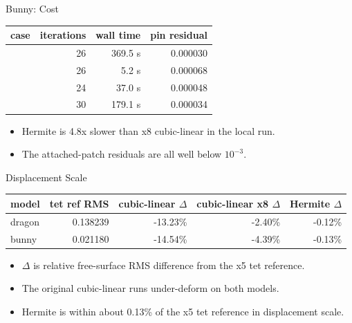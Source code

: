 \documentclass[aspectratio=169,10pt]{beamer}
\newcommand{\case}[1]{\texttt{\detokenize{#1}}}
\newcommand{\good}[1]{\textcolor{pgoGreen}{#1}}
\newcommand{\cost}[1]{\textcolor{pgoOrange}{#1}}
\begin{document}
\begin{frame}{Bunny: Cost}
  \small
  \begin{table}
    \centering
    \begin{tabular}{lrrr}
      \toprule
      case & iterations & wall time & pin residual \\
      \midrule
      \case{tet_ref} & 26 & 369.5 s & 0.000030 \\
      \case{cubic_linear} & 26 & 5.2 s & 0.000068 \\
      \case{cubic_linear_x8} & 24 & 37.0 s & 0.000048 \\
      \case{cubic_hermite} & 30 & \cost{179.1 s} & 0.000034 \\
      \bottomrule
    \end{tabular}
  \end{table}

  \vspace{0.8em}
  \begin{itemize}
    \item Hermite is 4.8x slower than x8 cubic-linear in the local run.
    \item The attached-patch residuals are all well below $10^{-3}$.
  \end{itemize}
\end{frame}

\begin{frame}{Displacement Scale}
  \small
  \begin{table}
    \centering
    \begin{tabular}{lrrrr}
      \toprule
      model & tet ref RMS & cubic-linear $\Delta$ & cubic-linear x8 $\Delta$ & Hermite $\Delta$ \\
      \midrule
      dragon & 0.138239 & -13.23\% & -2.40\% & \good{-0.12\%} \\
      bunny & 0.021180 & -14.54\% & -4.39\% & \good{-0.13\%} \\
      \bottomrule
    \end{tabular}
  \end{table}

  \vspace{0.8em}
  \begin{itemize}
    \item $\Delta$ is relative free-surface RMS difference from the x5 tet reference.
    \item The original cubic-linear runs under-deform on both models.
    \item Hermite is within about 0.13\% of the x5 tet reference in displacement scale.
  \end{itemize}
\end{frame}
\end{document}
